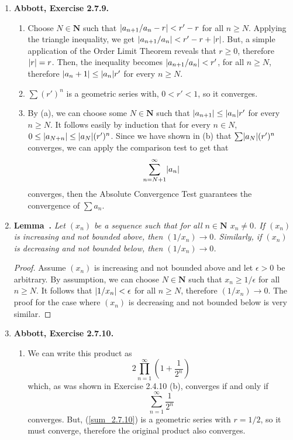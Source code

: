 \documentclass{article}
\newcounter{lemmaCounter}
\newenvironment{shortlemma}{\refstepcounter{lemmaCounter}
\noindent\textbf{Lemma~\thelemmaCounter.}\em}
\DeclarePairedDelimiter\abs{\lvert}{\rvert}
\newcommand{\N}{\mathbf{N}}
\newcommand{\exc}[2][Abbott]{\item \textbf{#1, Exercise #2.}}
\newcommand{\lep}[1][L]{#1et $\epsilon > 0$ be arbitrary}
\begin{document}
\begin{enumerate}
    \exc{2.7.9}
    \begin{enumerate}
        \item Choose $N \in \N$ such that $\abs*{a_{n+1}/a_n - r} < r'- r$ for all $n \geq N$. Applying the triangle inequality, we get $\abs*{a_{n+1}/a_n} < r' -r + \abs*{r}$. But, a simple application of the Order Limit Theorem reveals that $r \geq 0$, therefore $\abs*{r}=r$. Then, the inequality becomes $\abs*{a_{n+1}/a_n} < r'$, for all $n \geq N$, therefore $\abs*{a_n+1} \leq \abs*{a_n} r'$ for every $n \geq N$.
        
        \item $\sum (r')^n$ is a geometric series with, $0 < r' < 1$, so it converges.
        
        \item By (a), we can choose some $N \in \N$ such that $\abs*{a_{n+1}} \leq \abs*{a_n} r'$ for every $n \geq N$. It follows easily by induction that for every $n \in N$, $0 \leq \abs*{a_{N+n}} \leq \abs*{a_N} (r')^n$. Since we have shown in (b) that $\sum \abs*{a_N} (r')^n$ converges, we can apply the comparison test to get that 
        \begin{equation*}
            \sum_{n=N+1}^\infty \abs*{a_n}
        \end{equation*} converges, then the Absolute Convergence Test guarantees the convergence of $\sum a_n$.
    \end{enumerate} 
    
    \item \begin{shortlemma} \label{lem_1OverInfinityIsZero}
        Let $(x_n)$ be a sequence such that for all $n \in \N$ $x_n \neq 0$.
        If $(x_n)$ is increasing and not bounded above, then $(1/x_n) \to 0$. Similarly, if $(x_n)$ is decreasing and not bounded below, then $(1/x_n) \to 0$.
    \end{shortlemma}
    \begin{proof}
        Assume $(x_n)$ is increasing and not bounded above and \lep[l]. By assumption, we can choose $N \in \N$ such that $x_n \geq 1/\epsilon$ for all $n \geq N$. It follows that $\abs*{1/x_n} < \epsilon$ for all $n \geq N$, therefore $(1/x_n) \to 0$. The proof for the case where $(x_n)$ is decreasing and not bounded below is very similar.
    \end{proof}
    
    \exc{2.7.10}
    \begin{enumerate}
        \item We can write this product as 
        \begin{equation*}
            2  \prod_{n=1}^\infty (1 + \frac{1}{2^n})
        \end{equation*} which, as was shown in Exercise 2.4.10 (b), converges if and only if 
        \begin{equation} \label{sum_2.7.10}
            \sum_{n=1}^\infty \frac{1}{2^n}
        \end{equation} converges. But, (\ref{sum_2.7.10}) is a geometric series with $r = 1/2$, so it must converge, therefore the original product also converges.
        

\end{enumerate}
\end{enumerate}
\end{document}
